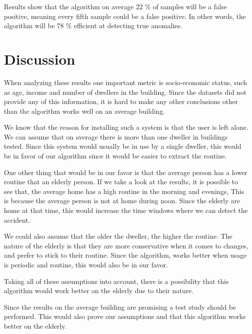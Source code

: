 Results show that the algorithm on average 22 \% of samples will be a false positive, meaning
every fifth sample could be a false positive. In other words, the algorithm will be 78 \% efficient at 
detecting true anomalies. 


\section{Discussion}

When analyzing these results one important metric is socio-economic status,
such as age, income and number of dwellers in the building. 
Since the datasets did not provide any of this information,
it is hard to make any other conclusions other than the algorithm
works well on an average building.

We know that the reason for installing such a system is that the user is left alone.
We can assume that on average there is more than one dweller in buildings tested.
Since this system would usually be in use by a single dweller,
this would be in favor of our algorithm since it would be 
easier to extract the routine.

One other thing that would be in our favor is that the average person has a lower routine that an elderly person. 
If we take a look at the results, it is possible to see that,
the average home has a high routine in the morning and evenings, 
This is because the average person is not at home during noon.
Since the elderly are home at that time, this would 
increase the time windows where we can detect 
the accident.

We could also assume that the older the dweller, the higher the routine. 
The nature of the elderly is that they are more conservative when it comes to changes,
and prefer to stick to their routine.
Since the algorithm, works better when usage is periodic and routine, this would also be in our favor. 

Taking all of these assumptions into account, 
there is a possibility that this algorithm would work 
better on the elderly due to their nature.

Since the results on the average building are promising
a test study should be performed. 
This would also prove our assumptions and that this algorithm works 
better on the elderly.